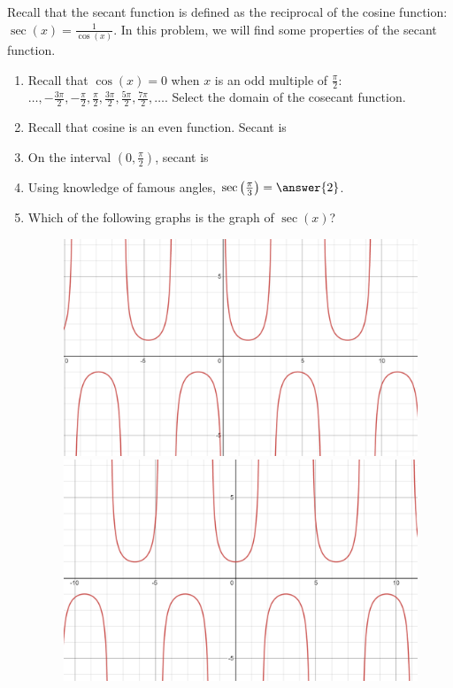 \documentclass{ximera}
\author{Kenneth Berglund}
\begin{document}
Recall that the secant function is defined as the reciprocal of the cosine function: $\sec(x) = \frac{1}{\cos(x)}$. In this problem, we will find some properties of the secant function. 
\begin{exercise}
\begin{enumerate}
\item Recall that $\cos(x) = 0$ when $x$ is an odd multiple of $\frac{\pi}{2}$: $\ldots, -\frac{3\pi}{2}, -\frac{\pi}{2}, \frac{\pi}{2}, \frac{3\pi}{2}, \frac{5\pi}{2}, \frac{7\pi}{2}, \ldots$. Select the domain of the cosecant function.
\begin{multipleChoice}
\choice{$(- \infty, \infty)$}
\end{multipleChoice}


\item Recall that cosine is an even function. Secant is 
\begin{multipleChoice}
\end{multipleChoice}


\item On the interval $\left(0, \frac{\pi}{2}\right)$, secant is 
\begin{multipleChoice}
\end{multipleChoice}

\item Using knowledge of famous angles, $\sec\left(\frac{\pi}{3}\right) = \answer{2}$.

\item Which of the following graphs is the graph of $\sec(x)$?
\begin{figure}[!h]
\begin{image}
\includegraphics[width=.4\linewidth]{ex8-a.png}
\hspace{20mm}
\includegraphics[width=.4\linewidth]{ex8-b.png}


\end{image}
\end{figure}
\end{enumerate}
\end{exercise}
\end{document}
